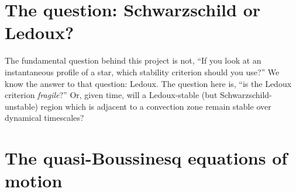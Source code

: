 \documentclass[onecolumn, amsmath, amsfonts, amssymb]{aastex62}
\begin{document}
\section{The question: Schwarzschild or Ledoux?}
The fundamental question behind this project is not, ``If you look at an instantaneous profile of a star, which stability criterion should you use?''
We know the answer to that question: Ledoux.
The question here is, ``is the Ledoux criterion \emph{fragile}?''
Or, given time, will a Ledoux-stable (but Schwarzschild-unstable) region which is adjacent to a convection zone remain stable over dynamical timescales?

\section{The quasi-Boussinesq equations of motion}
\end{document}
